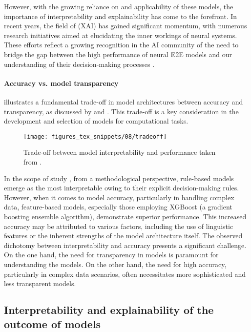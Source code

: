 However, with the growing reliance on and applicability of these models, the importance of interpretability and explainability has come to the forefront. In recent years, the field of  (XAI) has gained significant momentum, with numerous research initiatives aimed at elucidating the inner workings of neural systems. These efforts reflect a growing recognition in the AI community of the need to bridge the gap between the high performance of neural E2E models and our understanding of their decision-making processes \citep{Dosilovic2018,BARREDOARRIETA202082}.

\paragraph*{Accuracy vs. model transparency}

 illustrates a fundamental trade-off in model architectures between accuracy and transparency, as discussed by \citet{Dosilovic2018} and \citet{BARREDOARRIETA202082}. This trade-off is a key consideration in the development and selection of models for computational tasks.

\begin{figure}
	\centering
	\texttt{[image: figures\_tex\_snippets/08/tradeoff]}
	\caption[Trade-off between model interpretability and performance.]{Trade-off between model interpretability and performance taken from \citet{BARREDOARRIETA202082}.}
	\label{fig:tradeoff}
\end{figure}


In the scope of study \studF, from a methodological perspective, rule-based models emerge as the most interpretable owing to their explicit decision-making rules. However, when it comes to model accuracy, particularly in handling complex data, feature-based models, especially those employing XGBoost (a gradient boosting ensemble algorithm), demonstrate superior performance. This increased accuracy may be attributed to various factors, including the use of linguistic features or the inherent strengths of the model architecture itself. The observed dichotomy between interpretability and accuracy presents a significant challenge. On the one hand, the need for transparency in models is paramount for understanding the models. On the other hand, the need for high accuracy, particularly in complex data scenarios, often necessitates more sophisticated and less transparent models.



\subsection{Interpretability and explainability of the outcome of \context models}\label{chap8_subsec:interp}

